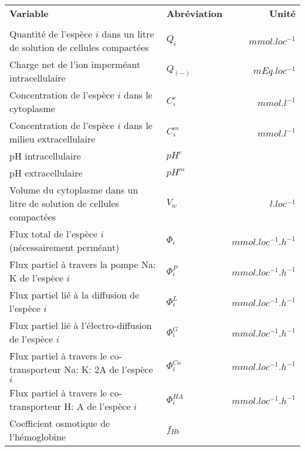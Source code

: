 \documentclass[a4paper,fleqn]{article}
\begin{document}
\begin{tabular}{p{8cm}lr}

\textbf{Variable}                                                      & \textbf{Abréviation}     & \textbf{Unité}      \\
\\
Quantité de l'espèce $i$ dans un litre de solution de cellules compactées  & $Q_i$                    & $mmol.loc^{-1}$     \\
Charge net de l'ion imperméant intracellulaire                         & $Q_{(-)}$               & $mEq.loc^{-1}$      \\
Concentration de l'espèce $i$ dans le cytoplasme                           & $C_{i}^{c}$              & $mmol.l^{-1}$       \\
Concentration de l'espèce $i$ dans le milieu extracellulaire               & $C_{i}^{m}$              & $mmol.l^{-1}$       \\
pH intracellulaire                                                     & $pH^c$                                         \\
pH extracellulaire                                                     & $pH^m$                                         \\
Volume du cytoplasme dans un litre de solution de cellules compactées & $V_w$                    & $l.loc^{-1}$        \\
Flux total de l'espèce $i$ (nécessairement perméant)                       & $\Phi_i$                 & $mmol.loc^{-1}.h^{-1}$\\
Flux partiel à travers la pompe Na: K de l'espèce $i$                      & $\Phi_{i}^{P}$           & $mmol.loc^{-1}.h^{-1}$\\
Flux partiel lié à la diffusion de l'espèce $i$                             & $\Phi_{i}^{L}$           & $mmol.loc^{-1}.h^{-1}$\\
Flux partiel lié à l'électro-diffusion de l'espèce $i$                      & $\Phi_{i}^{G}$           & $mmol.loc^{-1}.h^{-1}$\\
Flux partiel à travers le co-transporteur Na: K: 2A de l'espèce $i$         & $\Phi_{i}^{Co}$          & $mmol.loc^{-1}.h^{-1}$\\
Flux partiel à travers le co-transporteur H: A de l'espèce $i$              & $\Phi_{i}^{HA}$          & $mmol.loc^{-1}.h^{-1}$\\
Coefficient osmotique de l'hémoglobine                                 & $f_{Hb}$                                       \\

\end{tabular}
\end{document}
